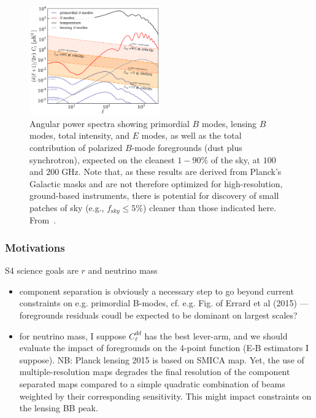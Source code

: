 \begin{figure}[htbp]
\centering
\includegraphics[width=0.5\textwidth]{Analysis/Power_Spectrum_figure_showing_foregrounds.pdf}
\caption{Angular power spectra showing primordial $B$ modes, lensing $B$ modes, total intensity, and $E$ modes, as well as the total contribution of polarized $B$-mode foregrounds (dust plus synchrotron), expected on the cleanest $1-90\%$ of the sky, at $100$ and $200\;$GHz. Note that, as these results are derived from Planck's Galactic masks and are not therefore optimized for high-resolution, ground-based instruments, there is potential for discovery of small patches of sky (e.g., $f_{\mathrm sky} \leq 5\%$) cleaner than those indicated here. From~\cite{}.}
\label{default}
\end{figure}


\subsubsection{Motivations}

S4 science goals are $r$ and neutrino mass
\begin{itemize}
	\item component separation is obviously a necessary step to go beyond current constraints on e.g. primordial B-modes, cf. e.g. Fig.  of Errard et al (2015) --- foregrounds residuals coudl be expected to be dominant on largest scales?
	\item for neutrino mass, I suppose $C_\ell^{dd}$ has the best lever-arm, and we should evaluate the impact of foregrounds on the 4-point function (E-B estimators I suppose). NB: Planck lensing 2015 is based on SMICA map. Yet, the use of multiple-resolution maps degrades the final resolution of the component separated maps compared to a simple quadratic combination of beams weighted by their corresponding sensitivity. This might impact constraints on the lensing BB peak.
\end{itemize}

